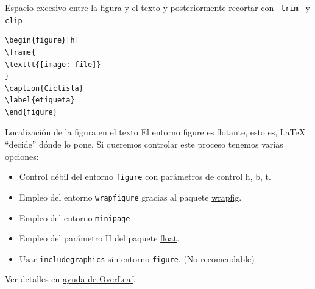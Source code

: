 \documentclass[10pt]{beamer}
\begin{document}

\begin{frame}[fragile]{Espacio excesivo entre la figura y el texto}
y posteriormente recortar con \texttt{ trim } y \texttt{ clip}
\begin{figure}
\vspace{2cm}
\end{figure}
\begin{verbatim}
\begin{figure}[h]
\frame{
\texttt{[image: file]}
}
\caption{Ciclista}
\label{etiqueta}
\end{figure}
\end{verbatim}
\end{frame}


\begin{frame}[fragile]{Localización de la figura en el texto}
El entorno figure es flotante, esto es, \LaTeX{} ``decide''
dónde lo pone. Si queremos controlar este proceso tenemos varias 
opciones:
\begin{itemize}
    \item Control débil del entorno \texttt{figure} con parámetros 
    de control h, b, t.  
    \item Empleo del entorno \texttt{wrapfigure} gracias al paquete \href{https://www.ctan.org/pkg/wrapfig}{\color{blue} wrapfig}.
     \item Empleo del entorno \texttt{minipage} 
    \item Empleo del parámetro H del paquete \href{https://www.ctan.org/pkg/float}{\color{blue} float}.
    \item Usar \texttt{includegraphics} sin entorno \texttt{figure}. \hfill (No recomendable)
\end{itemize}
\vspace{1cm}
Ver detalles en \href{https://www.overleaf.com/learn/latex/Positioning_images_and_tables}{\color{blue}ayuda de OverLeaf}.
\end{frame}
\end{document}
